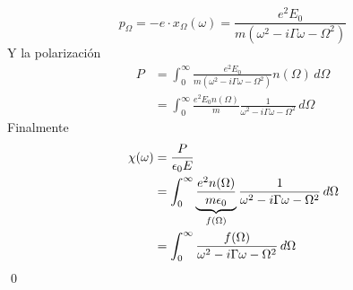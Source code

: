 \documentclass[]{article}
\numberwithin{equation}{section}
\begin{document}
\begin{enumerate}
\begin{enumerate}
\begin{equation*}
			p_\Omega = -e \cdot x_\Omega (\omega) = \frac{e^2 E_0}{m \left(\omega^2 - i \Gamma \omega - \Omega^2\right)}
		\end{equation*}
		Y la polarización
		\begin{align*}
			P &= \int_{0}^{\infty} \frac{e^2 E_0}{m \left(\omega^2 - i \Gamma \omega - \Omega^2\right)} n(\Omega) \, d\Omega\\
			&= \int_{0}^{\infty} \frac{e^2 E_0 n(\Omega)}{m} \frac{1 }{\omega^2 - i \Gamma \omega - \Omega^2} \, d\Omega
		\end{align*}
		Finalmente
		\begin{align}
			\chi(\omega) &= \frac{P}{\epsilon_{0} E}\nonumber\\
			&= \int_{0}^{\infty} \underbrace{\frac{e^2 n(\Omega)}{m \epsilon_{0}}}_{f(\Omega)} \frac{1 }{\omega^2 - i \Gamma \omega - \Omega^2} \, d\Omega\nonumber\\
			&= \int_{0}^{\infty} \frac{f(\Omega)}{\omega^2 - i \Gamma \omega - \Omega^2} \, d\Omega
		\end{align}
		\qed
		

\end{enumerate}
\end{enumerate}
\end{document}
